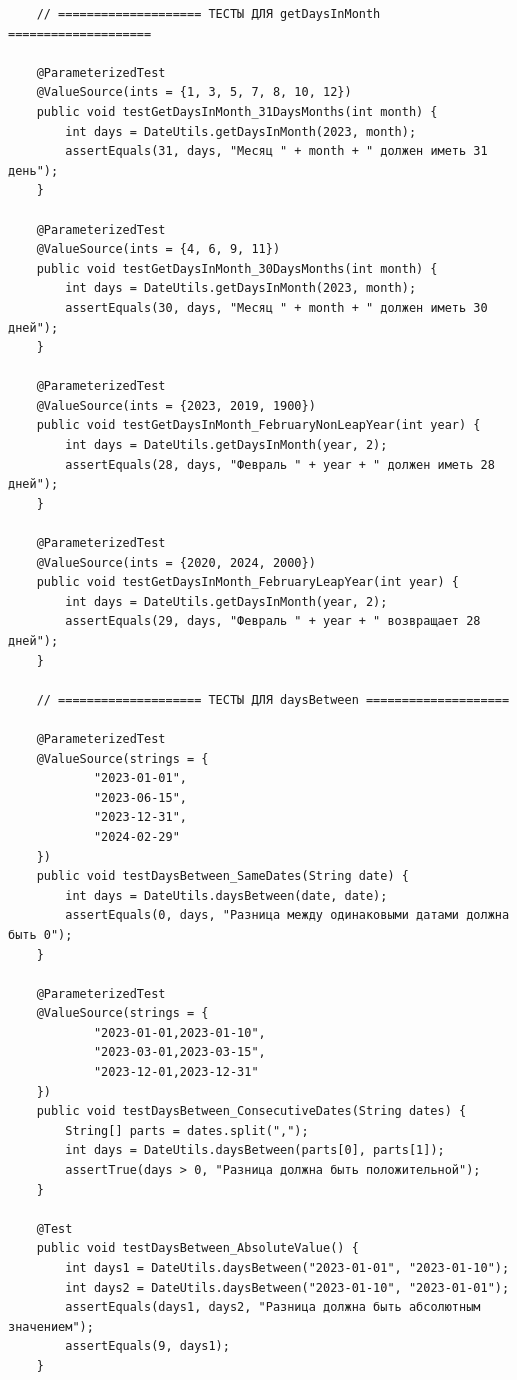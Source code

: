 \documentclass{article}[14pt]
\begin{document}
\begin{lstlisting}
    // ==================== ТЕСТЫ ДЛЯ getDaysInMonth ====================

    @ParameterizedTest
    @ValueSource(ints = {1, 3, 5, 7, 8, 10, 12})
    public void testGetDaysInMonth_31DaysMonths(int month) {
        int days = DateUtils.getDaysInMonth(2023, month);
        assertEquals(31, days, "Месяц " + month + " должен иметь 31 день");
    }

    @ParameterizedTest
    @ValueSource(ints = {4, 6, 9, 11})
    public void testGetDaysInMonth_30DaysMonths(int month) {
        int days = DateUtils.getDaysInMonth(2023, month);
        assertEquals(30, days, "Месяц " + month + " должен иметь 30 дней");
    }

    @ParameterizedTest
    @ValueSource(ints = {2023, 2019, 1900})
    public void testGetDaysInMonth_FebruaryNonLeapYear(int year) {
        int days = DateUtils.getDaysInMonth(year, 2);
        assertEquals(28, days, "Февраль " + year + " должен иметь 28 дней");
    }

    @ParameterizedTest
    @ValueSource(ints = {2020, 2024, 2000})
    public void testGetDaysInMonth_FebruaryLeapYear(int year) {
        int days = DateUtils.getDaysInMonth(year, 2);
        assertEquals(29, days, "Февраль " + year + " возвращает 28 дней");
    }

    // ==================== ТЕСТЫ ДЛЯ daysBetween ====================

    @ParameterizedTest
    @ValueSource(strings = {
            "2023-01-01",
            "2023-06-15",
            "2023-12-31",
            "2024-02-29"
    })
    public void testDaysBetween_SameDates(String date) {
        int days = DateUtils.daysBetween(date, date);
        assertEquals(0, days, "Разница между одинаковыми датами должна быть 0");
    }

    @ParameterizedTest
    @ValueSource(strings = {
            "2023-01-01,2023-01-10",
            "2023-03-01,2023-03-15",
            "2023-12-01,2023-12-31"
    })
    public void testDaysBetween_ConsecutiveDates(String dates) {
        String[] parts = dates.split(",");
        int days = DateUtils.daysBetween(parts[0], parts[1]);
        assertTrue(days > 0, "Разница должна быть положительной");
    }

    @Test
    public void testDaysBetween_AbsoluteValue() {
        int days1 = DateUtils.daysBetween("2023-01-01", "2023-01-10");
        int days2 = DateUtils.daysBetween("2023-01-10", "2023-01-01");
        assertEquals(days1, days2, "Разница должна быть абсолютным значением");
        assertEquals(9, days1);
    }


\end{lstlisting}
\end{document}
